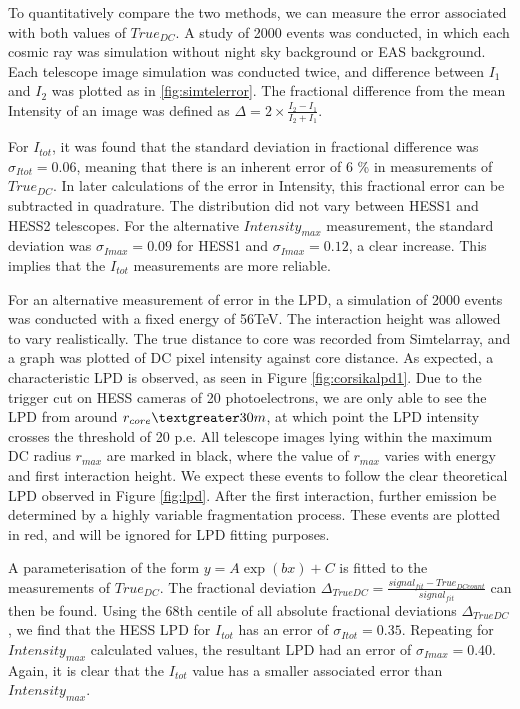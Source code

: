\documentclass[11pt]{article}
\begin{document}
To quantitatively compare the two methods, we can measure the error associated with both values of $True_{DC}$. A study of 2000 events was conducted, in which each cosmic ray was simulation without night sky background or EAS background. Each telescope image simulation was conducted twice, and difference between $I_{1}$ and $I_{2}$ was plotted as in \ref{fig:simtelerror}. The fractional difference from the mean Intensity of an image was defined as $\Delta = 2 \times \frac{I_{2} - I_{1}}{{I_{2} + I_{1}}}$. 

For $I_{tot}$, it was found that the standard deviation in fractional difference was $\sigma_{Itot}=0.06$, meaning that there is an inherent error of 6 \% in measurements of $True_{DC}$. In later calculations of the error in Intensity, this fractional error can be subtracted in quadrature. The distribution did not vary between HESS1 and HESS2 telescopes. For the alternative $Intensity_{max}$ measurement, the standard deviation was $\sigma_{Imax}=0.09$ for HESS1 and $\sigma_{Imax}=0.12$, a clear increase. This implies that the $I_{tot}$ measurements are more reliable.

For an alternative measurement of error in the LPD, a simulation of 2000 events was conducted with a fixed energy of 56TeV. The interaction height was allowed to vary realistically. The true distance to core was recorded from Sim\textunderscore telarray, and a graph was plotted of DC pixel intensity against core distance. As expected, a characteristic LPD is observed, as seen in Figure \ref{fig:corsikalpd1}. Due to the trigger cut on HESS cameras of 20 photoelectrons, we are only able to see the LPD from around $r_{core} \textgreater 30m$, at which point the LPD intensity crosses the threshold of 20 p.e. All telescope images lying within the maximum DC radius $r_{max}$ are marked in black, where the value of $r_{max}$ varies with energy and first interaction height. We expect these events to follow the clear theoretical LPD observed in Figure \ref{fig:lpd}. After the first interaction, further emission be determined by a highly variable fragmentation process. These events are plotted in red, and will be ignored for LPD fitting purposes. 

A parameterisation of the form $y = A \exp (b x) + C $ is fitted to the measurements of $True_{DC}$. The fractional deviation $\Delta_{TrueDC} = \frac{signal_{fit} - True_{DC count}}{signal_{fit}}$ can then be found. Using the 68th centile of all absolute fractional deviations $\Delta_{TrueDC}$, we find that the HESS LPD for $I_{tot}$ has an error of $\sigma_{Itot}=0.35$. Repeating for $Intensity_{max}$ calculated values, the resultant LPD had an error of $\sigma_{Imax} = 0.40$. Again, it is clear that the $I_{tot}$ value has a smaller associated error than $Intensity_{max}$.
\end{document}
